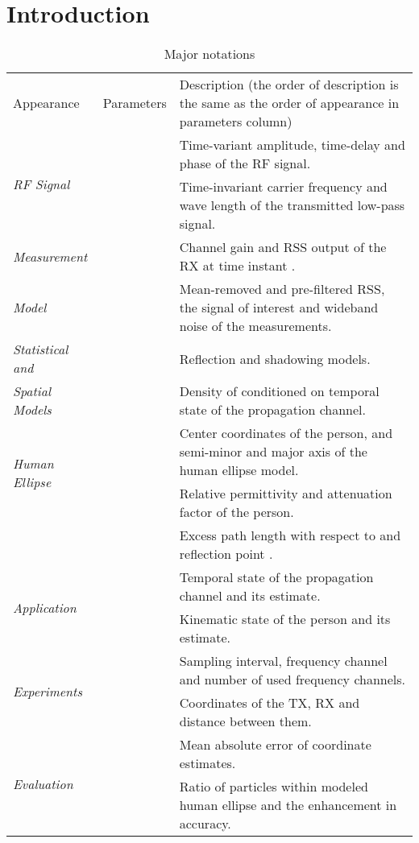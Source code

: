 \documentclass[journal, 10pt, twocolumn, balance]{IEEEtran}
\begin{document}
\section{Introduction} \label{S:introduction}
\begin{table*}\caption{Major notations} \centering \renewcommand{\arraystretch}{1.2}\begin{tabular}{| l | c | l |} 
	\hline\hline
        \multirow{2}{*}{Appearance} & \multirow{2}{*}{Parameters} & \multirow{2}{*}{Description (the order of description is the same as the order of appearance in parameters column)}  \\
	& & \\ \hline
	
	\multirow{2}{*}{\emph{RF Signal}}  & & Time-variant amplitude, time-delay and phase of the RF signal. \\
	&  & Time-invariant carrier frequency and wave length of the transmitted low-pass signal. \\ \hline
	
	\emph{Measurement}  &    & Channel gain and RSS output of the RX at time instant . \\
	\emph{Model} &  & Mean-removed and pre-filtered RSS, the signal of interest and wideband noise of the measurements.  \\ \hline
	
	\emph{Statistical and}  &  & Reflection and shadowing models. \\ 
	\emph{Spatial Models} &  & Density of  conditioned on temporal state of the propagation channel. \\ \hline
	
	\multirow{2}{*}{\emph{Human Ellipse}}  &  & Center coordinates of the person, and semi-minor and major axis of the human ellipse model.\\
	\multirow{2}{*}{\emph{Model}}  &    & Relative permittivity and attenuation factor of the person. \\
	
	 &  & Excess path length with respect to  and reflection point . \\ \hline
	
	
	\multirow{2}{*}{\emph{Application}}  &   &Temporal state of the propagation channel and its estimate.   \\ 
	&  &  Kinematic state of the person and its estimate. \\ \hline
	
	\multirow{2}{*}{\emph{Experiments}}  &   & Sampling interval, frequency channel and number of used frequency channels.  \\
	&  &  Coordinates of the TX, RX and distance between them.\\ \hline
	
	\multirow{2}{*}{\emph{Evaluation}}  &   & Mean absolute error of coordinate estimates.  \\
	&  &  Ratio of particles within modeled human ellipse and the enhancement in accuracy.\\ \hline
	
        \end{tabular}
        \label{table:major_notation} \end{table*}
\end{document}
